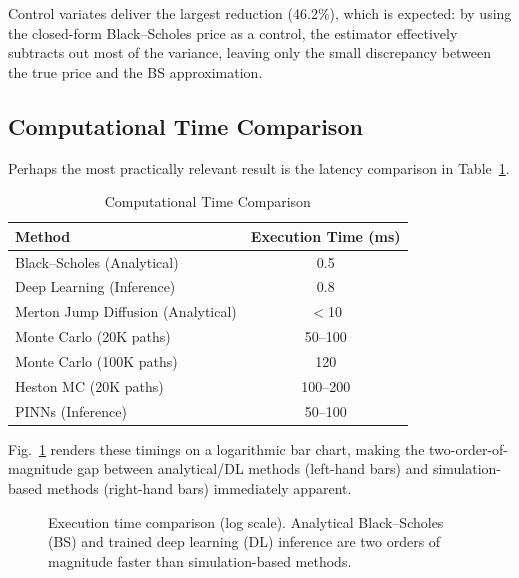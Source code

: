 \documentclass[conference]{IEEEtran}
\begin{document}
Control variates deliver the largest reduction (46.2\%), which is expected: by using the closed-form Black--Scholes price as a control, the estimator effectively subtracts out most of the variance, leaving only the small discrepancy between the true price and the BS approximation.

\subsection{Computational Time Comparison}

Perhaps the most practically relevant result is the latency comparison in Table~\ref{tab:time}.

\begin{table}[htbp]
\caption{Computational Time Comparison}
\label{tab:time}
\centering
\small
\setlength{\tabcolsep}{5pt}
\renewcommand{\arraystretch}{1.05}
\begin{tabular}{lc}
\toprule
\textbf{Method} & \textbf{Execution Time (ms)} \\
\midrule
Black--Scholes (Analytical) & 0.5 \\
Deep Learning (Inference) & 0.8 \\
Merton Jump Diffusion (Analytical) & $<$10 \\
Monte Carlo (20K paths) & 50--100 \\
Monte Carlo (100K paths) & 120 \\
Heston MC (20K paths) & 100--200 \\
PINNs (Inference) & 50--100 \\
\bottomrule
\end{tabular}
\end{table}

Fig.~\ref{fig:exec_time} renders these timings on a logarithmic bar chart, making the two-order-of-magnitude gap between analytical/DL methods (left-hand bars) and simulation-based methods (right-hand bars) immediately apparent.

\begin{figure}[htbp]
\centering
{}
\caption{Execution time comparison (log scale). Analytical Black--Scholes (BS) and trained deep learning (DL) inference are two orders of magnitude faster than simulation-based methods.}
\label{fig:exec_time}
\end{figure}
\end{document}
